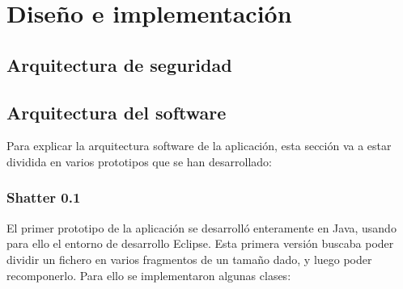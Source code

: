 
\chapter{Diseño e implementación} %

\label{Chapter4} %


\section{Arquitectura de seguridad}


\section{Arquitectura del software}

Para explicar la arquitectura software de la aplicación, esta sección va a estar dividida en varios
prototipos que se han desarrollado:

\subsection{Shatter 0.1}

El primer prototipo de la aplicación se desarrolló enteramente en Java, usando para ello el entorno
de desarrollo Eclipse. Esta primera versión buscaba poder dividir un fichero en varios fragmentos
de un tamaño dado, y luego poder recomponerlo. Para ello se implementaron algunas clases:

